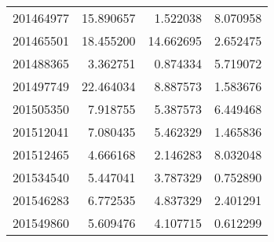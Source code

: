 \begin{tabular}{lrrr}
201464977 &  15.890657 &   1.522038 &   8.070958 \\
201465501 &  18.455200 &  14.662695 &   2.652475 \\
201488365 &   3.362751 &   0.874334 &   5.719072 \\
201497749 &  22.464034 &   8.887573 &   1.583676 \\
201505350 &   7.918755 &   5.387573 &   6.449468 \\
201512041 &   7.080435 &   5.462329 &   1.465836 \\
201512465 &   4.666168 &   2.146283 &   8.032048 \\
201534540 &   5.447041 &   3.787329 &   0.752890 \\
201546283 &   6.772535 &   4.837329 &   2.401291 \\
201549860 &   5.609476 &   4.107715 &   0.612299 \\
\bottomrule
\end{tabular}
